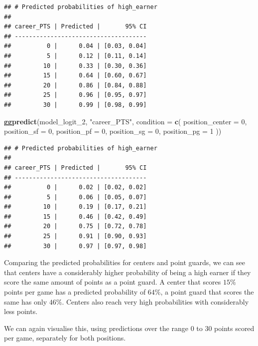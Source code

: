 \documentclass[
]{book}
\newenvironment{Shaded}{\begin{snugshade}}{\end{snugshade}}
\newcommand{\AttributeTok}[1]{\textcolor[rgb]{0.13,0.29,0.53}{#1}}
\newcommand{\DecValTok}[1]{\textcolor[rgb]{0.00,0.00,0.81}{#1}}
\newcommand{\FunctionTok}[1]{\textcolor[rgb]{0.13,0.29,0.53}{\textbf{#1}}}
\newcommand{\NormalTok}[1]{#1}
\newcommand{\StringTok}[1]{\textcolor[rgb]{0.31,0.60,0.02}{#1}}
\begin{document}
\begin{verbatim}
## # Predicted probabilities of high_earner
## 
## career_PTS | Predicted |       95% CI
## -------------------------------------
##          0 |      0.04 | [0.03, 0.04]
##          5 |      0.12 | [0.11, 0.14]
##         10 |      0.33 | [0.30, 0.36]
##         15 |      0.64 | [0.60, 0.67]
##         20 |      0.86 | [0.84, 0.88]
##         25 |      0.96 | [0.95, 0.97]
##         30 |      0.99 | [0.98, 0.99]
\end{verbatim}

\begin{Shaded}
\begin{Highlighting}[]
\FunctionTok{ggpredict}\NormalTok{(model\_logit\_2, }\StringTok{"career\_PTS"}\NormalTok{,}
          \AttributeTok{condition =} \FunctionTok{c}\NormalTok{(}
            \AttributeTok{position\_center =} \DecValTok{0}\NormalTok{,}
            \AttributeTok{position\_sf =} \DecValTok{0}\NormalTok{,}
            \AttributeTok{position\_pf =} \DecValTok{0}\NormalTok{,}
            \AttributeTok{position\_sg =} \DecValTok{0}\NormalTok{,}
            \AttributeTok{position\_pg =} \DecValTok{1}
\NormalTok{          ))}
\end{Highlighting}
\end{Shaded}

\begin{verbatim}
## # Predicted probabilities of high_earner
## 
## career_PTS | Predicted |       95% CI
## -------------------------------------
##          0 |      0.02 | [0.02, 0.02]
##          5 |      0.06 | [0.05, 0.07]
##         10 |      0.19 | [0.17, 0.21]
##         15 |      0.46 | [0.42, 0.49]
##         20 |      0.75 | [0.72, 0.78]
##         25 |      0.91 | [0.90, 0.93]
##         30 |      0.97 | [0.97, 0.98]
\end{verbatim}

Comparing the predicted probabilities for centers and point guards, we
can see that centers have a considerably higher probability of being a
high earner if they score the same amount of points as a point guard. A
center that scores \(15\%\) points per game has a predicted probability of
\(64\%\), a point guard that scores the same has only \(46\%\). Centers also
reach very high probabilities with considerably less points.

We can again visualise this, using predictions over the range \(0\) to \(30\) points
scored per game, separately for both positions.
\end{document}
